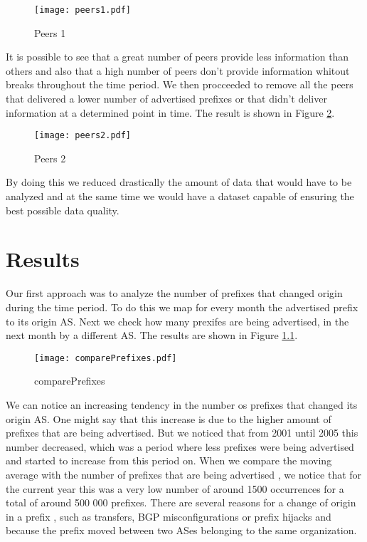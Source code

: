 \documentclass[11pt,a4paper]{scrreprt}
\begin{document}
\begin{figure}[h!]
\centering
\texttt{[image: peers1.pdf]}
\caption{Peers 1}
\label{fig:peers1}
\end{figure}

It is possible to see that a great number of peers provide less information than others and also that a high number of peers don't provide information whitout breaks throughout the time period. We then procceeded to remove all the peers that delivered a lower number of advertised prefixes or that didn't deliver information at a determined point in time. The result is shown in Figure \ref{fig:peers2}.  

\begin{figure}[ht!]
\centering
\texttt{[image: peers2.pdf]}
\caption{Peers 2}
\label{fig:peers2}
\end{figure}

By doing this we reduced drastically the amount of data that would have to be analyzed and at the same time we would have a dataset capable of ensuring the best possible data quality. 

\chapter{Results}

Our first approach was to analyze the number of prefixes that changed origin during the time period. To do this we map for every month the advertised prefix to its origin AS. Next we check how many prexifes are being advertised, in the next month by a different AS. The results are shown in Figure \ref{fig:comparePrefixes}.

\begin{figure}[ht!]
\centering
\texttt{[image: comparePrefixes.pdf]}
\caption{comparePrefixes}
\label{fig:comparePrefixes}
\end{figure}

We can notice an increasing tendency in the number os prefixes that changed its origin AS. One might say that this increase is due to the higher amount of prefixes that are being advertised. But we noticed that from 2001 until 2005 this number decreased, which was a period where less prefixes were being advertised and started to increase from this period on. When we compare the moving average with the number of prefixes that are being advertised \cite{Potaroo}, we notice that for the current year this was a very low number of around 1500 occurrences for a total of around 500 000 prefixes. There are several reasons for a change of origin in a prefix \cite{IPv4_Transfer_Markets}, such as transfers, BGP misconfigurations or prefix hijacks and because the prefix moved between two ASes belonging to the same organization.     
\end{document}
